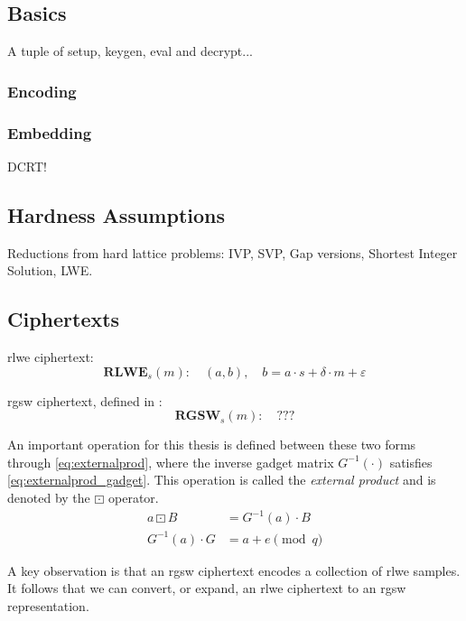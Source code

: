 \newpage

\subsection{Basics}

A tuple of setup, keygen, eval and decrypt...

\subsubsection{Encoding}



\subsubsection{Embedding}
DCRT!


\subsection{Hardness Assumptions}

Reductions from hard lattice problems: IVP, SVP, Gap versions, Shortest Integer Solution, LWE.

\subsection{Ciphertexts}

\gls{rlwe} ciphertext:
\begin{equation}
    \mathbf{RLWE}_{s}(m):\quad (a, b), \quad b = a\cdot s + \delta\cdot m + \varepsilon
\end{equation}

\gls{rgsw} ciphertext, defined in \cite{cryptoeprint:2013/340}:
\begin{equation}
    \mathbf{RGSW}_s(m):\quad ???
\end{equation}

An important operation for this thesis is defined between these two forms through \eqref{eq:externalprod}, where the inverse gadget matrix $G^{-1}(\cdot)$ satisfies \eqref{eq:externalprod_gadget}. This operation is called the \emph{external product} and is denoted by the $\boxdot$ operator.
\begin{align}
    \label{eq:externalprod}
    a \boxdot B &= G^{-1}(a)\cdot B \\
    \label{eq:externalprod_gadget}
    G^{-1}(a)\cdot G &= a + e \pmod{q}
\end{align}

A key observation is that an \gls{rgsw} ciphertext encodes a collection of \gls{rlwe} samples. It follows that we can convert, or expand, an \gls{rlwe} ciphertext to an \gls{rgsw} representation.

